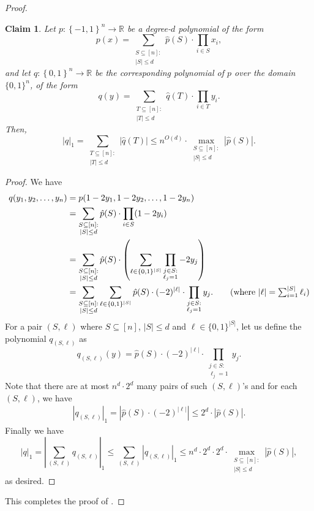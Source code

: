 \documentclass[10pt,a4paper]{article}
\newtheorem{claim}[theorem]{Claim}
\newcommand{\bool}{\left\{0,1\right\}}
\newcommand{\boolpm}{\left\{-1,1\right\}}
\newcommand{\real}{\mathbb{R}}
\begin{document}
\begin{proof}
    	\begin{claim}\label{claim:prg-magnitude}
    		Let $p\colon\boolpm^{n}\to\real$ be a degree-$d$ polynomial of the form
    		\[
    			p(x)=\sum_{\substack{S\subseteq[n]: \\ |S|\leq d}} \hat{p}(S)\cdot \prod_{i\in S} x_i,
    		\]
    		and let $q\colon\bool^{n}\to\real$ be the corresponding polynomial of $p$ over the domain $\{0,1\}^n$, of the form
    		\[
    			q(y)=\sum_{\substack{T\subseteq[n]: \\ |T|\leq d}} \hat{q}(T)\cdot \prod_{i\in T} y_i.
    		\]
    		Then,
    		\[
    			|q|_1 = \sum_{\substack{T\subseteq[n]: \\ |T|\leq d}} |\hat{q}(T)| \leq n^{O(d)}\cdot \max_{\substack{S\subseteq[n]: \\ |S|\leq d}} |\hat{p}(S)|.
    		\]
    	\end{claim}
    	
    	\begin{proof}\renewcommand{\qedsymbol}{$\square$ (\Cref{claim:prg-magnitude})}
    		We have
    		\begin{align*}
    			q(y_1,y_2,\dots,y_n) &= p(1-2y_1,1-2y_2,\dots,1-2y_n)\\
    			&= \sum_{\substack{S\subseteq[n]: \\ |S|\leq d}} \hat{p}(S)\cdot \prod_{i\in S} (1-2y_i)\\
    			&= \sum_{\substack{S\subseteq[n]: \\ |S|\leq d}} \hat{p}(S)\cdot \left(\sum_{\ell\in \{0,1\}^{|S|}}\prod_{\substack{j\in S:\\ \ell_j=1}}-2y_j \right)\\
    			&= \sum_{\substack{S\subseteq[n]: \\ |S|\leq d}} \sum_{\ell\in \{0,1\}^{|S|}} \hat{p}(S)\cdot(-2)^{|\ell|}\cdot \prod_{\substack{j\in S:\\ \ell_j=1}} y_j. \tag{where $|\ell| = \sum_{i=1}^{|S|}\ell_i$}
    		\end{align*}
    		For a pair $(S,\ell)$ where $S \subseteq[n]$, $|S|\leq d$ and $\ell\in\{0,1\}^{|S|}$, let us define the polynomial $q_{(S,\ell)}$ as
    		\[
    			q_{(S,\ell)}(y)= \hat{p}(S)\cdot(-2)^{|\ell|}\cdot \prod_{\substack{j\in S:\\ \ell_j=1}} y_j.
    		\]
    		Note that there are at most $n^{d}\cdot2^{d}$ many pairs of such $(S,\ell)$'s and for each $(S,\ell)$, we have
    		\begin{align*}
    			|q_{(S,\ell)}|_1 = \left|\hat{p}(S)\cdot(-2)^{|\ell|}\right|\leq 2^{d}\cdot |\hat{p}(S)|.
    		\end{align*}
    	    Finally we have
    		\[
    			|q|_1 = \left|\sum_{(S,\ell)} q_{(S,\ell)}\right|_1\leq \sum_{(S,\ell)} |q_{(S,\ell)}|_1\leq n^{d}\cdot 2^d \cdot 2^d \cdot \max_{\substack{S\subseteq[n]: \\ |S|\leq d}} |\hat{p}(S)|,
    		\]
    		as desired.
    	\end{proof}
    	
    	This completes the proof of .
	\end{proof}
\end{document}
